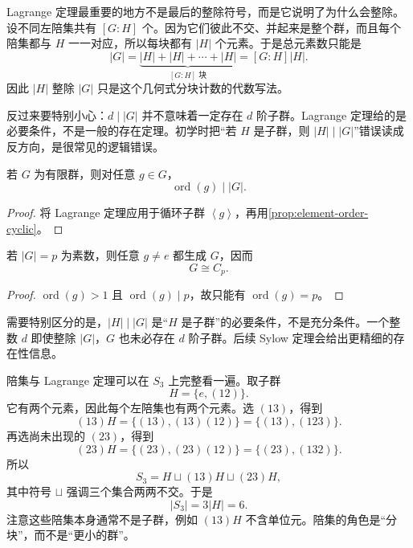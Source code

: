 Lagrange 定理最重要的地方不是最后的整除符号，而是它说明了为什么会整除。设不同左陪集共有 $[G:H]$ 个。因为它们彼此不交、并起来是整个群，而且每个陪集都与 $H$ 一一对应，所以每块都有 $|H|$ 个元素。于是总元素数只能是
\[
|G|=\underbrace{|H|+|H|+\cdots+|H|}_{[G:H]\text{ 块}}=[G:H]|H|.
\]
因此 $|H|$ 整除 $|G|$ 只是这个几何式分块计数的代数写法。

反过来要特别小心：$d\mid |G|$ 并不意味着一定存在 $d$ 阶子群。Lagrange 定理给的是必要条件，不是一般的存在定理。初学时把“若 $H$ 是子群，则 $|H|\mid|G|$”错误读成反方向，是很常见的逻辑错误。


\begin{corollary}[群元的阶整除群阶]
若 $G$ 为有限群，则对任意 $g\in G$，
\[
\operatorname{ord}(g)\mid \lvert G\rvert.
\]
\label{cor:element-order-divides-group}

\end{corollary}

\begin{proof}
将 Lagrange 定理应用于循环子群 $\left\langle g\right\rangle$，再用\cref{prop:element-order-cyclic}。
\end{proof}

\begin{corollary}[素数阶群必循环]
若 $\lvert G\rvert=p$ 为素数，则任意 $g\neq e$ 都生成 $G$，因而
\[
G\cong C_p.
\]
\label{cor:prime-order-cyclic}

\end{corollary}

\begin{proof}
$\operatorname{ord}(g)>1$ 且 $\operatorname{ord}(g)\mid p$，故只能有 $\operatorname{ord}(g)=p$。
\end{proof}

需要特别区分的是，$\lvert H\rvert\mid\lvert G\rvert$ 是“$H$ 是子群”的必要条件，不是充分条件。一个整数 $d$ 即使整除 $\lvert G\rvert$，$G$ 也未必存在 $d$ 阶子群。后续 Sylow 定理会给出更精细的存在性信息。

陪集与 Lagrange 定理可以在 $S_3$ 上完整看一遍。取子群
\[
H=\{e,(12)\}.
\]
它有两个元素，因此每个左陪集也有两个元素。选 $(13)$，得到
\[
(13)H=\{(13),(13)(12)\}=\{(13),(123)\}.
\]
再选尚未出现的 $(23)$，得到
\[
(23)H=\{(23),(23)(12)\}=\{(23),(132)\}.
\]
所以
\[
S_3=H\sqcup(13)H\sqcup(23)H,
\]
其中符号 $\sqcup$ 强调三个集合两两不交。于是
\[
|S_3|=3|H|=6.
\]
注意这些陪集本身通常不是子群，例如 $(13)H$ 不含单位元。陪集的角色是“分块”，而不是“更小的群”。

